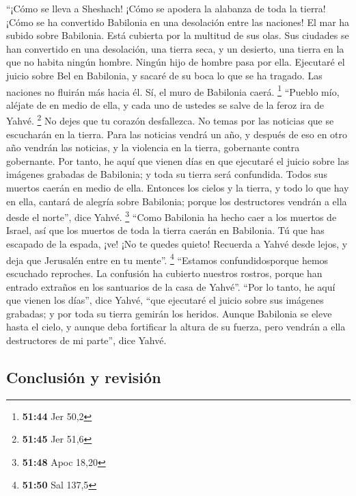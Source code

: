 \begin{paracol}{2}
 ``¡Cómo se lleva a Sheshach! ¡Cómo se apodera la
alabanza de toda la tierra! ¡Cómo se ha convertido Babilonia en una
desolación entre las naciones!  El mar ha subido sobre
Babilonia. Está cubierta por la multitud de sus olas. 
Sus ciudades se han convertido en una desolación, una tierra seca, y un
desierto, una tierra en la que no habita ningún hombre. Ningún hijo de
hombre pasa por ella.  Ejecutaré el juicio sobre Bel en
Babilonia, y sacaré de su boca lo que se ha tragado. Las naciones no
fluirán más hacia él. Sí, el muro de Babilonia caerá. \footnote{\textbf{51:44}
  Jer 50,2}  ``Pueblo mío, aléjate de en medio de ella, y
cada uno de ustedes se salve de la feroz ira de Yahvé. \footnote{\textbf{51:45}
  Jer 51,6}  No dejes que tu corazón desfallezca. No
temas por las noticias que se escucharán en la tierra. Para las noticias
vendrá un año, y después de eso en otro año vendrán las noticias, y la
violencia en la tierra, gobernante contra gobernante. 
Por tanto, he aquí que vienen días en que ejecutaré el juicio sobre las
imágenes grabadas de Babilonia; y toda su tierra será confundida. Todos
sus muertos caerán en medio de ella.  Entonces los cielos
y la tierra, y todo lo que hay en ella, cantará de alegría sobre
Babilonia; porque los destructores vendrán a ella desde el norte'', dice
Yahvé. \footnote{\textbf{51:48} Apoc 18,20}  ``Como
Babilonia ha hecho caer a los muertos de Israel, así que los muertos de
toda la tierra caerán en Babilonia.  Tú que has escapado
de la espada, ¡ve! ¡No te quedes quieto! Recuerda a Yahvé desde lejos, y
deja que Jerusalén entre en tu mente''. \footnote{\textbf{51:50} Sal
  137,5}  ``Estamos confundidosporque hemos escuchado
reproches. La confusión ha cubierto nuestros rostros, porque han entrado
extraños en los santuarios de la casa de Yahvé''.  ``Por
lo tanto, he aquí que vienen los días'', dice Yahvé, ``que ejecutaré el
juicio sobre sus imágenes grabadas; y por toda su tierra gemirán los
heridos.  Aunque Babilonia se eleve hasta el cielo, y
aunque deba fortificar la altura de su fuerza, pero vendrán a ella
destructores de mi parte'', dice Yahvé.

\hypertarget{conclusiuxf3n-y-revisiuxf3n}{%
\subsection{Conclusión y revisión}\label{conclusiuxf3n-y-revisiuxf3n}}


\end{paracol}
